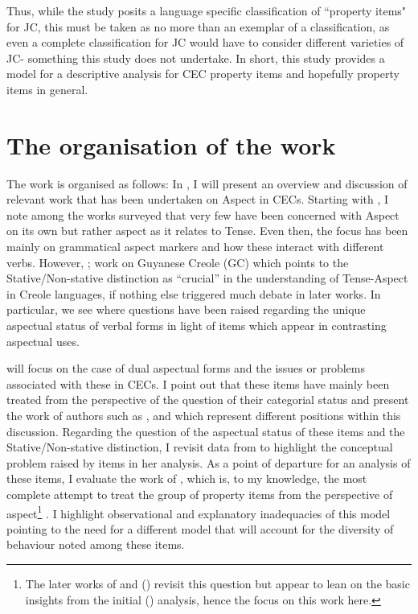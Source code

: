 Thus, while the study posits a language specific classification of
``property items" for JC, this must be taken as no more than an
exemplar of a classification, as even a complete classification for JC
would have to consider different varieties of JC- something this study
does not undertake. In short, this study provides a model for a
descriptive analysis for CEC property items and hopefully property
items in general.

\section{The organisation of the work}\label{sec:1.8}

The work is organised as follows: In , I will present an overview and
discussion of relevant work that has been undertaken on Aspect in CECs.
Starting with \citet{Voorhoeve1957}, I note among the works surveyed that very
few have been concerned with Aspect on its own but rather aspect as it relates
to Tense.  Even then, the focus has been mainly on grammatical aspect markers
and how these interact with different verbs. However, ;
work on Guyanese Creole (GC) which points to the Stative\slash Non-stative distinction
as ``crucial'' in the understanding of Tense-Aspect in Creole languages, if
nothing else triggered much debate in later works.  In particular, we see where
questions have been raised regarding the unique aspectual status of verbal forms
in light of items which appear in contrasting aspectual uses.

 will focus on the case of dual aspectual forms and the issues or
problems associated with these in CECs. I point out that these items have mainly
been treated from the perspective of the question of their categorial status and
present the work of authors such as \citet{Sebba1986}, \citet{Seuren1986} and
\citet{Kouwenberg1996} which represent different positions within this
discussion.  Regarding the question of the aspectual status of these items and
the Stative\slash Non-stative distinction, I revisit data from \citet{Jaganauth1987}
to highlight the conceptual problem raised by items in her analysis.  As a point
of departure for an analysis of these items, I evaluate the work of
\citet{Winford1993}, which is, to my knowledge, the most complete attempt to
treat the group of property items from the perspective of aspect\footnote{The
  later works of \citet{Winford1997} and (\citeyear{Winford2000}) revisit this question but appear
  to lean on the basic insights from the initial (\citeyear{Winford1993}) analysis, hence the
focus on this work here.} .  I highlight observational and explanatory
inadequacies of this model pointing to the need for a different model that will
account for the diversity of behaviour noted among these items.

